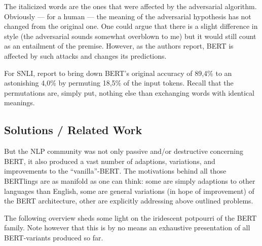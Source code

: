 The italicized words are the ones that were affected by the adversarial algorithm.
Obviously --- for a human --- the meaning of the adversarial hypothesis has not
changed from the original one. One could argue that there is a slight difference
in style (the adversarial sounds somewhat overblown to me) but it would still count
as an entailment of the premise. However, as the authors report, BERT is affected
by such attacks and changes its predictions.

For SNLI, \citeauthor{jin2020bert} report to bring down BERT's original accuracy of
89,4\% to an astonishing 4,0\% by permuting 18,5\% of the input tokens. Recall that
the permutations are, simply put, nothing else than exchanging words with identical meanings.




\subsection{Solutions / Related Work}

But the NLP community was not only passive and/or destructive concerning BERT, it also
produced a vast number of adaptions, variations, and improvements to the ``vanilla''-BERT.
The motivations behind all those BERTlings are as manifold as one can think: some are simply
adaptions to other languages than English, some are general variations (in hope of improvement)
of the BERT architecture, other are explicitly addressing above outlined problems.

The following overview sheds some light on the iridescent potpourri of the BERT
family.
Note however that this is by no means an exhaustive presentation of all BERT-variants produced so far.


